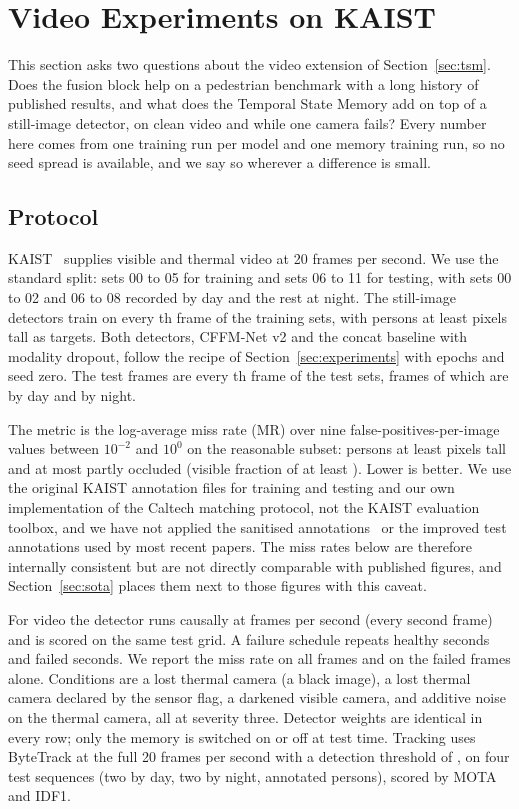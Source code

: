 \section{Video Experiments on KAIST}
\label{sec:video}
This section asks two questions about the video extension of Section~\ref{sec:tsm}. Does the fusion block help on a pedestrian benchmark with a long history of published results, and what does the Temporal State Memory add on top of a still-image detector, on clean video and while one camera fails? Every number here comes from one training run per model and one memory training run, so no seed spread is available, and we say so wherever a difference is small.

\subsection{Protocol}
\label{sec:kaistprotocol}
KAIST~\cite{hwang2015kaist} supplies visible and thermal video at 20 frames per second. We use the standard split: sets 00 to 05 for training and sets 06 to 11 for testing, with sets 00 to 02 and 06 to 08 recorded by day and the rest at night. The still-image detectors train on every \cfgKaistTrainStride{}th frame of the training sets, with persons at least \cfgKaistTrainMinH{} pixels tall as targets. Both detectors, CFFM-Net v2 and the concat baseline with modality dropout, follow the recipe of Section~\ref{sec:experiments} with \cfgKaistEpochs{} epochs and seed zero. The test frames are every \cfgKaistTestStride{}th frame of the test sets, \kstNAll{} frames of which \kstNDay{} are by day and \kstNNight{} by night.

The metric is the log-average miss rate (MR) over nine false-positives-per-image values between $10^{-2}$ and $10^{0}$ on the reasonable subset: persons at least \cfgKaistMinH{} pixels tall and at most partly occluded (visible fraction of at least \cfgKaistMinVis{}). Lower is better. We use the original KAIST annotation files for training and testing and our own implementation of the Caltech matching protocol, not the KAIST evaluation toolbox, and we have not applied the sanitised annotations~\cite{li2018kaistsanitized} or the improved test annotations used by most recent papers. The miss rates below are therefore internally consistent but are not directly comparable with published figures, and Section~\ref{sec:sota} places them next to those figures with this caveat.

For video the detector runs causally at \cfgFailFps{} frames per second (every second frame) and is scored on the same test grid. A failure schedule repeats \cfgFailSeconds{} healthy seconds and \cfgFailSeconds{} failed seconds. We report the miss rate on all frames and on the failed frames alone. Conditions are a lost thermal camera (a black image), a lost thermal camera declared by the sensor flag, a darkened visible camera, and additive noise on the thermal camera, all at severity three. Detector weights are identical in every row; only the memory is switched on or off at test time. Tracking uses ByteTrack at the full 20 frames per second with a detection threshold of \cfgTrackConf{}, on four test sequences (two by day, two by night, \trkUniqueTotal{} annotated persons), scored by MOTA and IDF1.

